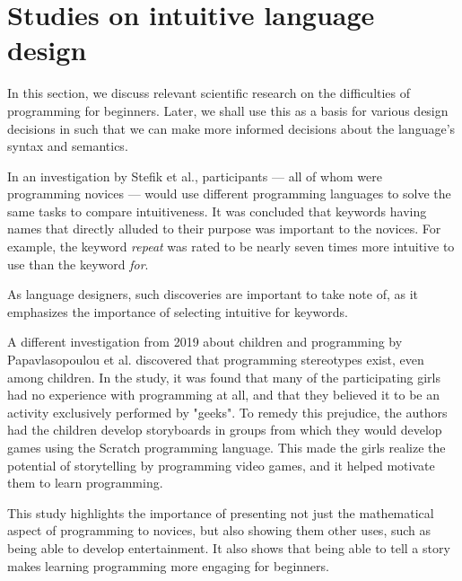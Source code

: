 \section{Studies on intuitive language design} \label{sec:scientific_research}
In this section, we discuss relevant scientific research on the difficulties of programming for beginners.
Later, we shall use this as a basis for various design decisions in \dazel{} such that we can make more
informed decisions about the language's syntax and semantics.

In an investigation by Stefik et al.\cite{stefik_empirical_2011}, participants — all of whom were
programming novices — would use different programming languages to solve the same tasks to compare intuitiveness.
It was concluded that keywords having names that directly alluded to their purpose was important to the novices.
For example, the keyword \emph{repeat} was rated to be nearly seven times more intuitive to use than the keyword \emph{for}.

\noindent
As language designers, such discoveries are important to take note of, as it emphasizes the importance of selecting intuitive for keywords.

A different investigation from 2019 about children and programming by Papavlasopoulou et al.\cite{papavlasopoulou_exploring_2019} discovered that
programming stereotypes exist, even among children.
In the study, it was found that many of the participating girls had no experience with programming at all, and that they believed it
to be an activity exclusively performed by "geeks".
To remedy this prejudice, the authors had the children develop storyboards in groups from which they would develop games using the
Scratch programming language.
This made the girls realize the potential of storytelling by programming video games, and it helped motivate them to learn programming.

\noindent
This study highlights the importance of presenting not just the mathematical aspect of programming to novices, but also
showing them other uses, such as being able to develop entertainment.
It also shows that being able to tell a story makes learning programming more engaging for beginners.



